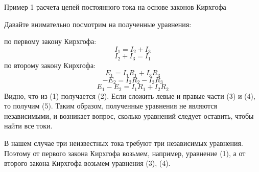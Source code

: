 \documentclass[10pt, pdf, hyperref={unicode},handout]{beamer}
\begin{document}
\begin{frame}{Пример 1  расчета цепей постоянного тока на основе законов Кирхгофа}
  \begin{block}

    \small{
      Давайте внимательно посмотрим на полученные уравнения:

      по первому закону Кирхгофа:
      \begin{equation} I_1=I_2+I_3\end{equation}
      \begin{equation}I_2+I_3=I_1\end{equation}
      по второму закону Кирхгофа:
      \begin{equation}E_1=I_1R_1+I_3R_3\end{equation}
      \begin{equation}-E_2=I_2R_2-I_3R_3\end{equation}
      \begin{equation}E_1-E_2=I_1R_1+I_2R_2\end{equation}
      Видно, что из (1) получается (2). Если сложить левые и правые части (3) и (4), то получим (5). Таким образом, полученные уравнения не являются независимыми, и возникает вопрос, сколько уравнений следует оставить, чтобы найти все токи.

      В нашем случае три неизвестных тока требуют три независимых уравнения. Поэтому от первого закона Кирхгофа возьмем, например, уравнение (1), а  от второго закона Кирхгофа возьмем уравнения (3), (4). 
}

  \end{block}
  
\end{frame}
\end{document}
